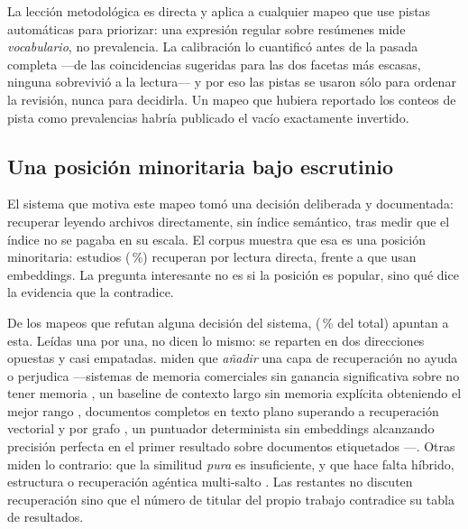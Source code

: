 \documentclass[conference]{IEEEtran}
\begin{document}
La lección metodológica es directa y aplica a cualquier mapeo que use pistas automáticas para
priorizar: una expresión regular sobre resúmenes mide \emph{vocabulario}, no prevalencia. La
calibración lo cuantificó antes de la pasada completa —de las coincidencias sugeridas para las dos
facetas más escasas, ninguna sobrevivió a la lectura— y por eso las pistas se usaron sólo para
ordenar la revisión, nunca para decidirla. Un mapeo que hubiera reportado los conteos de pista como
prevalencias habría publicado el vacío exactamente invertido.

\subsection{Una posición minoritaria bajo escrutinio}
\label{sec:disc-gmdos}

El sistema que motiva este mapeo tomó una decisión deliberada y documentada: recuperar leyendo
archivos directamente, sin índice semántico, tras medir que el índice no se pagaba en su escala. El
corpus muestra que esa es una posición minoritaria: \clRQtresGrep{} estudios
(\clRQtresGrepPct{}\,\%) recuperan por lectura directa, frente a \clRQtresEmbeddings{} que usan
embeddings. La pregunta interesante no es si la posición es popular, sino qué dice la evidencia que
la contradice.

De los \clMFrefuta{} mapeos que refutan alguna decisión del sistema, \clMFrefutaGMdos{}
(\clMFrefutaGMdosPct{}\,\% del total) apuntan a esta. Leídas una por una, no dicen lo mismo: se
reparten en dos direcciones opuestas y casi empatadas. \clGMdosMenos{} miden que \emph{añadir} una
capa de recuperación no ayuda o perjudica —sistemas de memoria comerciales sin ganancia significativa
sobre no tener memoria \cite{cW4414815971}, un baseline de contexto largo sin memoria explícita
obteniendo el mejor rango \cite{cW7161915937,cW7130618007}, documentos completos en texto plano
superando a recuperación vectorial y por grafo \cite{cW7138265814}, un puntuador determinista sin
embeddings alcanzando precisión perfecta en el primer resultado sobre documentos etiquetados
\cite{cW7154651477}—. Otras \clGMdosMas{} miden lo contrario: que la similitud \emph{pura} es
insuficiente, y que hace falta híbrido, estructura o recuperación agéntica multi-salto
\cite{cW4406840428,cW7130236833,cW7133363879}. Las
\clGMdosCalidad{} restantes no discuten recuperación sino que el número de titular del propio
trabajo contradice su tabla de resultados.
\end{document}
